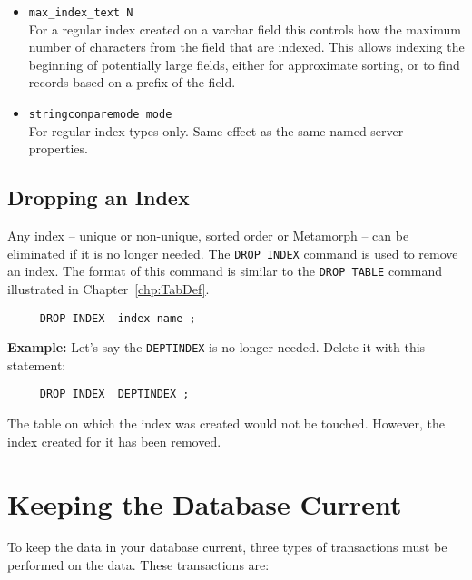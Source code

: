 \begin{itemize}
  \item \verb`max_index_text N` \\

    For a regular index created on a varchar field this controls
    how the maximum number of characters from the field that are indexed.
    This allows indexing the beginning of potentially large fields, either
    for approximate sorting, or to find records based on a prefix of the
    field.

  \item \verb`stringcomparemode mode` \\

    For regular index types only.  Same effect as the same-named
    server properties.
\end{itemize}

\section{Dropping an Index}

Any index -- unique or non-unique, sorted order or Metamorph -- can be
eliminated if it is no longer needed.  The {\tt DROP INDEX} command is
used to remove an index.  The format of this command is similar to the
{\tt DROP TABLE} command illustrated in Chapter~\ref{chp:TabDef}.

\begin{verbatim}
     DROP INDEX  index-name ;
\end{verbatim}

{\bf Example:}
Let's say the \verb`DEPTINDEX` is no longer needed.  Delete it with this
statement:
\begin{verbatim}
     DROP INDEX  DEPTINDEX ;
\end{verbatim}

%

The table on which the index was created would not be touched.
However, the index created for it has been removed.

\chapter{Keeping the Database Current}{\label{chp:DBCurr}}

To keep the data in your database current, three types of transactions
must be performed on the data.  These transactions are:

